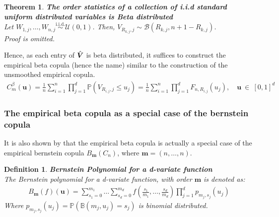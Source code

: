 \documentclass[12pt]{report}
\newtheorem{theorem}{Theorem}[subsection]
\newtheorem{definition}{Definition}[subsection]
\newcommand{\1}{\mathbf{1}}
\begin{document}
\begin{flushleft}
\begin{theorem}\label{OrderStatisticsBeta}
\textbf{The order statistics of a collection of i.i.d standard uniform distributed variables is Beta distributed} \\
Let $W_{1,j}, \dots, W_{n,j} \overset{\text{i.i.d.}}{\sim} \mathcal{U}(0,1)$. Then, $V_{R_{k,j},j} \sim \mathcal{B}(R_{k,j}, n + 1 - R_{k,j})$. \\
Proof is omitted.
\end{theorem}

\newpage
Hence, as each entry of $\Hat{\boldsymbol{V}}$ is beta distributed, it suffices to construct the empirical beta copula (hence the name) similar to the construction of the unsmoothed empirical copula.
\begin{align*}
C^{\beta}_{m}(\textbf{u}) = \frac{1}{n} \sum\limits_{i = 1}^{n} \prod\limits_{j = 1}^{d} \mathbb{P}(V_{R_{i,j},j} \le u_{j}) = \frac{1}{n} \sum\limits_{i = 1}^{n} \prod\limits_{j = 1}^{d} F_{n,R_{i,j}}(u_{j}), \quad \textbf{u} \: \in \: [0,1]^{d}
\end{align*}

\subsubsection{The empirical beta copula as a special case of the bernstein copula}
\vspace{0.5cm}

It is also shown by \cite{SegersEBC} that the empirical beta copula is actually a special case of the empirical bernstein copula $B_{\boldsymbol{m}}(C_{n})$, where $\boldsymbol{m} = (n, \dots, n)$.

\begin{definition}\label{BernsteinPolynomial}
\textit{\normalfont\parencite{SegersEBC}}\:
\textbf{Bernstein Polynomial for a d-variate function} \\
The Bernstein polynomial for a d-variate function, with order $\textbf{m}$ is denoted as:
\begin{align*}
B_{\textbf{m}}(f)(\textbf{u}) = \sum\limits_{s_{1} = 0}^{m_{1}} \dots \sum\limits_{s_{d} = 0}^{m_{d}} f \left(\frac{s_{1}}{m_{1}}, \dots, \frac{s_{d}}{m_{d}} \right) \prod\limits_{j = 1}^{d} p_{m_{j},s_{j}}(u_{j})
\end{align*}
Where $p_{m_{j},s_{j}}(u_{j}) = \mathbb{P}(\mathbb{B}(m_{j},u_{j}) = s_{j})$ is binomial distributed. \\ 
\end{definition}


\end{flushleft}
\end{document}

